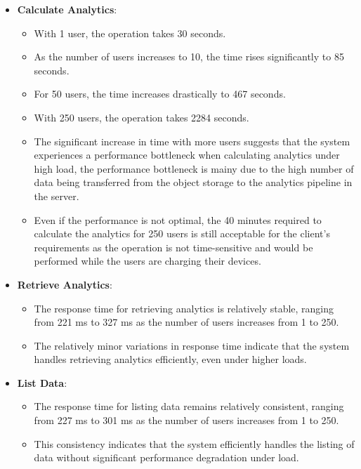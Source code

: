\begin{itemize}
\item \textbf{Calculate Analytics}:
    \begin{itemize}
    \item With 1 user, the operation takes 30 seconds.
    \item As the number of users increases to 10, the time rises significantly to 85 seconds.
    \item For 50 users, the time increases drastically to 467 seconds.
    \item With 250 users, the operation takes 2284 seconds.
    \item The significant increase in time with more users suggests that the system experiences a performance bottleneck when calculating analytics under high load, the performance bottleneck is mainy due to the high number of data being transferred from the object storage to the analytics pipeline in the server.
    \item Even if the performance is not optimal, the 40 minutes required to calculate the analytics for 250 users is still acceptable for the client's requirements as the operation is not time-sensitive and would be performed while the users are charging their devices.
    \end{itemize}

\item \textbf{Retrieve Analytics}:
    \begin{itemize}
        \item The response time for retrieving analytics is relatively stable, ranging from 221 ms to 327 ms as the number of users increases from 1 to 250.
        \item The relatively minor variations in response time indicate that the system handles retrieving analytics efficiently, even under higher loads.
    \end{itemize}

\item \textbf{List Data}:
    \begin{itemize}
        \item The response time for listing data remains relatively consistent, ranging from 227 ms to 301 ms as the number of users increases from 1 to 250.
        \item This consistency indicates that the system efficiently handles the listing of data without significant performance degradation under load.
    \end{itemize}
\end{itemize}

